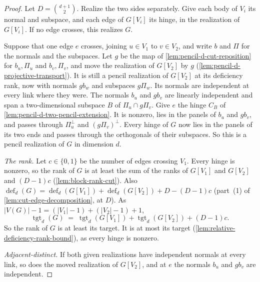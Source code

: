 \begin{proof}
  \leanok
  Let $D = \binom{d+1}{2}$. Realize the two sides separately. Give each
  body of $V_i$ its normal and subspace, and each edge of $G[V_i]$ its
  hinge, in the realization of $G[V_i]$. If no edge crosses, this
  realizes $G$.

  Suppose that one edge $e$ crosses, joining $u \in V_1$ to $v \in V_2$,
  and write $b$ and $\Pi$ for the normals and the subspaces. Let $g$ be
  the map of \cref{lem:pencil-d-cut-reposition} for $b_u, \Pi_u$ and
  $b_v, \Pi_v$, and move the realization of $G[V_2]$ by $g$
  (\cref{lem:pencil-d-projective-transport}). It is still a pencil
  realization of $G[V_2]$ at its deficiency rank, now with normals
  $g b_w$ and subspaces $g\Pi_w$. Its normals are independent at every
  link where they were. The normals $b_u$ and $g b_v$ are linearly
  independent and span a two-dimensional subspace $B$ of
  $\Pi_u \cap g\Pi_v$. Give $e$ the hinge $C_B$ of
  \cref{lem:pencil-d-two-pencil-extension}. It is nonzero, lies in the
  panels of $b_u$ and $g b_v$, and passes through $\Pi_u^{\perp}$ and
  $(g\Pi_v)^{\perp}$. Every hinge of $G$ now lies in the panels of its
  two ends and passes through the orthogonals of their subspaces. So this
  is a pencil realization of $G$ in dimension $d$.

  \emph{The rank.} Let $c \in \{0, 1\}$ be the number of edges crossing
  $V_1$. Every hinge is nonzero, so the rank of $G$ is at least the sum
  of the ranks of $G[V_1]$ and $G[V_2]$ and $(D - 1)c$
  (\cref{lem:block-rank-cut}). Also
  $\operatorname{def}_d(G) = \operatorname{def}_d(G[V_1]) +
  \operatorname{def}_d(G[V_2]) + D - (D - 1)c$ (part~(1) of
  \cref{lem:cut-edge-decomposition}, at $D$). As
  $|V(G)| - 1 = (|V_1| - 1) + (|V_2| - 1) + 1$,
  \[
    \operatorname{tgt}_d(G) \;=\; \operatorname{tgt}_d(G[V_1]) +
    \operatorname{tgt}_d(G[V_2]) + (D - 1)c.
  \]
  So the rank of $G$ is at least its target. It is at most its target
  (\cref{lem:relative-deficiency-rank-bound}), as every hinge is nonzero.

  \emph{Adjacent-distinct.} If both given realizations have independent
  normals at every link, so does the moved realization of $G[V_2]$, and
  at $e$ the normals $b_u$ and $g b_v$ are independent.
\end{proof}

